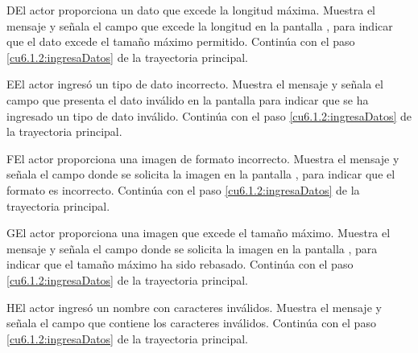  \begin{UCtrayectoriaA}{D}{El actor proporciona un dato que excede la longitud máxima.}
    \UCpaso[\UCsist] Muestra el mensaje  y señala el campo que excede la 
    longitud en la pantalla , para indicar que el dato excede el tamaño máximo permitido.
    \UCpaso[] Continúa con el paso \ref{cu6.1.2:ingresaDatos} de la trayectoria principal.
 \end{UCtrayectoriaA}
 \begin{UCtrayectoriaA}{E}{El actor ingresó un tipo de dato incorrecto.}
    \UCpaso[\UCsist] Muestra el mensaje  y señala el campo que presenta el dato inválido en la 
    pantalla  para indicar que se ha ingresado un tipo de dato inválido.
    \UCpaso[] Continúa con el paso \ref{cu6.1.2:ingresaDatos} de la trayectoria principal.
 \end{UCtrayectoriaA}
 \begin{UCtrayectoriaA}{F}{El actor proporciona una imagen de formato incorrecto.}
    \UCpaso[\UCsist] Muestra el mensaje  y señala el campo donde se solicita la imagen
    en la pantalla , para indicar que el formato es incorrecto.
    \UCpaso[] Continúa con el paso \ref{cu6.1.2:ingresaDatos} de la trayectoria principal.
 \end{UCtrayectoriaA}
 
 \begin{UCtrayectoriaA}{G}{El actor proporciona una imagen que excede el tamaño máximo.}
    \UCpaso[\UCsist] Muestra el mensaje  y señala el campo donde se solicita la imagen
    en la pantalla , para indicar que el tamaño máximo ha sido rebasado.
    \UCpaso[] Continúa con el paso \ref{cu6.1.2:ingresaDatos} de la trayectoria principal.
 \end{UCtrayectoriaA}
 \begin{UCtrayectoriaA}{H}{El actor ingresó un nombre con caracteres inválidos.}
    \UCpaso[\UCsist] Muestra el mensaje  y señala el campo que contiene los caracteres inválidos.
    \UCpaso[] Continúa con el paso \ref{cu6.1.2:ingresaDatos} de la trayectoria principal.
 \end{UCtrayectoriaA}
